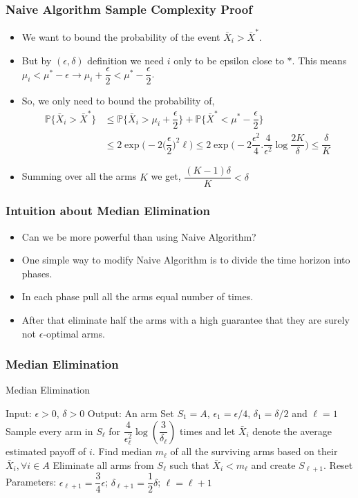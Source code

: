 \begin{frame}
\frametitle{Naive Algorithm Sample Complexity Proof}
\begin{itemize}
\item<1-> We want to bound the probability of the event $\bar{X}_i > \bar{X}^* $.
\item<2-> But by $(\epsilon,\delta)$ definition we need $i$ only to be epsilon close to $*$. This means $\mu_i<\mu^* - \epsilon \rightarrow \mu_i + \dfrac{\epsilon}{2} <\mu^* - \dfrac{\epsilon}{2}$.
\item<3-> So, we only need to bound the probability of, 
\begin{align*}
\mathbb{P}\lbrace\bar{X}_i > \bar{X}^* \rbrace &\leq \mathbb{P}\bigg\lbrace \bar{X}_i > \mu_i + \dfrac{\epsilon}{2}\bigg\rbrace + \mathbb{P}\bigg\lbrace \bar{X}^* < \mu^* - \dfrac{\epsilon}{2}\bigg\rbrace\\
&\leq 2\exp\bigg(-2\big (\dfrac{\epsilon}{2}\big)^{2}\ell\bigg)\leq 2\exp\bigg(-2\dfrac{\epsilon^2}{4}. \dfrac{4}{\epsilon^{2}}\log \dfrac{2K}{\delta} \bigg)\leq \dfrac{\delta}{K}
\end{align*}
\item<4-> Summing over all the arms $K$ we get, $\dfrac{(K-1)\delta}{K}< \delta$
\end{itemize}
\end{frame}

\begin{frame}
\frametitle{Intuition about Median Elimination}
\begin{itemize}
\item<1-> Can we be more powerful than using Naive Algorithm?
\item<2-> One simple way to modify Naive Algorithm is to divide the time horizon into phases.
\item<3-> In each phase pull all the arms equal number of times.
\item<4-> After that eliminate half the arms with a high guarantee that they are surely not $\epsilon$-optimal arms.
\end{itemize}
\end{frame}

\begin{frame}
\frametitle{Median Elimination}
\begin{algorithm}[H]
\caption{Median Elimination}
\begin{algorithmic}[1]
\State Input: $\epsilon > 0$, $\delta > 0$
\State Output: An arm  
\State Set $S_1 =A$, $\epsilon_1 = \epsilon/4$, $\delta_1=\delta/2$ and $\ell=1$
\State Sample every arm in $S_\ell$ for $\dfrac{4}{\epsilon_{\ell}^{2}}\log(\dfrac{3}{\delta_\ell})$ times and let $\bar{X}_i$ denote the average estimated payoff of $i$.
\State Find median $m_{\ell}$ of all the surviving arms based on their $\bar{X}_{i},\forall i\in A$
\State Eliminate all arms from $S_{\ell}$ such that $\bar{X}_{i}< m_{\ell}$ and create $S_{\ell+1}$.
\State Reset Parameters: $\epsilon_{\ell+1}=\dfrac{3}{4}\epsilon$; $\delta_{\ell+1}=\dfrac{1}{2}\delta$; $\ell=\ell+1$
\EndFor
\end{algorithmic}
\end{algorithm}
\cite{even2006action}
\end{frame}
